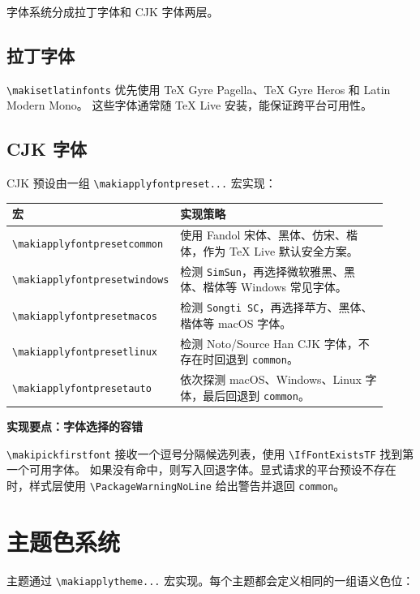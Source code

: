 \documentclass[a4paper,11pt]{ltxdoc}
\newcommand{\mopt}[1]{\texttt{#1}}
\newcommand{\mcmd}[1]{\texttt{\textbackslash#1}}
\newenvironment{implementation}[1]
  {\par\medskip\noindent\textbf{\color{MakiBlue}实现要点：#1}\par\smallskip}
  {\par\medskip}
\begin{document}
字体系统分成拉丁字体和 CJK 字体两层。

\subsection{拉丁字体}

\mcmd{makisetlatinfonts} 优先使用 TeX Gyre Pagella、TeX Gyre Heros 和 Latin Modern Mono。
这些字体通常随 TeX Live 安装，能保证跨平台可用性。

\subsection{CJK 字体}

CJK 预设由一组 \mcmd{makiapplyfontpreset...} 宏实现：

\begin{longtable}{@{}p{0.36\linewidth}p{0.56\linewidth}@{}}
\toprule
宏 & 实现策略 \\
\midrule
\mcmd{makiapplyfontpresetcommon} & 使用 Fandol 宋体、黑体、仿宋、楷体，作为 TeX Live 默认安全方案。\\
\mcmd{makiapplyfontpresetwindows} & 检测 \mopt{SimSun}，再选择微软雅黑、黑体、楷体等 Windows 常见字体。\\
\mcmd{makiapplyfontpresetmacos} & 检测 \mopt{Songti SC}，再选择苹方、黑体、楷体等 macOS 字体。\\
\mcmd{makiapplyfontpresetlinux} & 检测 Noto/Source Han CJK 字体，不存在时回退到 \mopt{common}。\\
\mcmd{makiapplyfontpresetauto} & 依次探测 macOS、Windows、Linux 字体，最后回退到 \mopt{common}。\\
\bottomrule
\end{longtable}

\begin{implementation}{字体选择的容错}
\mcmd{makipickfirstfont} 接收一个逗号分隔候选列表，使用 \mcmd{IfFontExistsTF} 找到第一个可用字体。
如果没有命中，则写入回退字体。显式请求的平台预设不存在时，样式层使用
\mcmd{PackageWarningNoLine} 给出警告并退回 \mopt{common}。
\end{implementation}

\section{主题色系统}

主题通过 \mcmd{makiapplytheme...} 宏实现。每个主题都会定义相同的一组语义色位：
\end{document}
